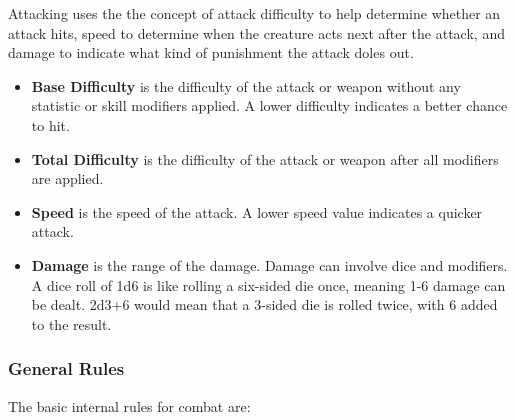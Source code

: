 Attacking uses the the concept of attack difficulty to help determine whether
an attack hits, speed to determine when the creature acts next after the 
attack, and damage to indicate what kind of punishment the attack doles out.

\begin{itemize}
\item {\bf Base Difficulty} is the difficulty of the attack or weapon
without any statistic or skill modifiers applied.  A lower difficulty
indicates a better chance to hit.
\item {\bf Total Difficulty} is the difficulty of the attack or weapon
after all modifiers are applied.
\item {\bf Speed} is the speed of the attack.  A lower speed value
indicates a quicker attack.
\item {\bf Damage} is the range of the damage.  Damage can involve dice
and modifiers.  A dice roll of 1d6 is like rolling a six-sided die once,
meaning 1-6 damage can be dealt.  2d3+6 would mean that a 3-sided die
is rolled twice, with 6 added to the result.
\end{itemize}

\subsubsection{General Rules}

The basic internal rules for combat are:


